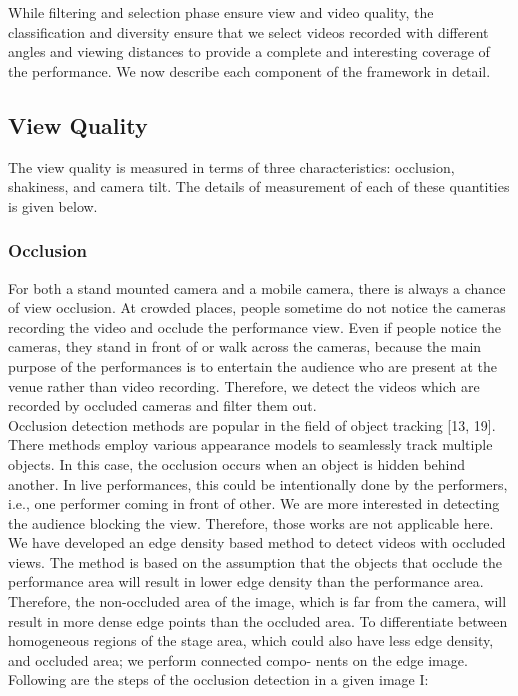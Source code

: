 \documentclass{sig-alternate}
\begin{document}
While filtering and selection phase ensure view and video quality, the classification and diversity ensure that we select videos
recorded with different angles and viewing distances to provide a
complete and interesting coverage of the performance. We now
describe each component of the framework in detail.

\subsection{View Quality}
The view quality is measured in terms of three characteristics:
occlusion, shakiness, and camera tilt. The details of measurement
of each of these quantities is given below.
 \subsubsection{Occlusion}
 For both a stand mounted camera and a mobile camera, there
is always a chance of view occlusion. At crowded places, people
sometime do not notice the cameras recording the video and occlude the performance view. Even if people notice the cameras,
they stand in front of or walk across the cameras, because the main
purpose of the performances is to entertain the audience who are
present at the venue rather than video recording. Therefore, we detect the videos which are recorded by occluded cameras and filter
them out.\\
Occlusion detection methods are popular in the field of object
tracking [13, 19]. There methods employ various appearance models to seamlessly track multiple objects. In this case, the occlusion
occurs when an object is hidden behind another. In live performances, this could be intentionally done by the performers, i.e.,
one performer coming in front of other. We are more interested in
detecting the audience blocking the view. Therefore, those works
are not applicable here.\\
We have developed an edge density based method to detect videos
with occluded views. The method is based on the assumption that
the objects that occlude the performance area will result in lower
edge density than the performance area. Therefore, the non-occluded
area of the image, which is far from the camera, will result in more
dense edge points than the occluded area. To differentiate between
homogeneous regions of the stage area, which could also have less
edge density, and occluded area; we perform connected compo-
nents on the edge image. Following are the steps of the occlusion
detection in a given image I:
\end{document}
